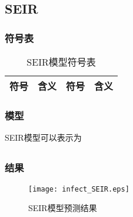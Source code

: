 \subsection{SEIR}
\subsubsection{符号表}
\begin{table}[H]
	\centering
	\caption{SEIR模型符号表}
	\begin{tabular}{llll}
		\hline
		符号&含义&符号&含义\\
		\hline
		\hline
	\end{tabular}
\end{table}
\subsubsection{模型}
	SEIR模型可以表示为
	\begin{align}
	\end{align}
\subsubsection{结果}
	\begin{figure}[H]
		\centering
		\texttt{[image: infect\_SEIR.eps]}
		\caption{SEIR模型预测结果}
	\end{figure}